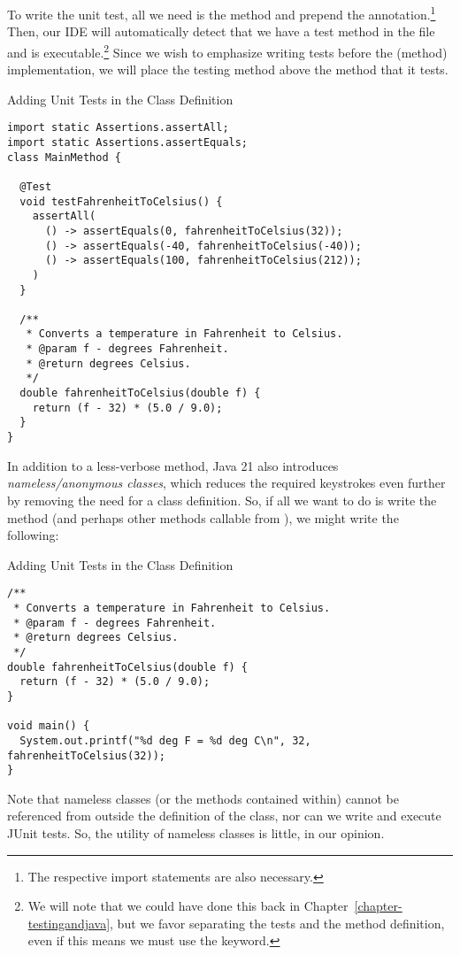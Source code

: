 To write the unit test, all we need is the  method and prepend the  annotation.\footnote{The respective import statements are also necessary.} Then, our IDE will automatically detect that we have a test method in the file and is executable.\footnote{We will note that we could have done this back in Chapter~\ref{chapter-testingandjava}, but we favor separating the tests and the method definition, even if this means we must use the  keyword.} Since we wish to emphasize writing tests before the (method) implementation, we will place the testing method above the method that it tests. 

\begin{cl}[]{Adding Unit Tests in the Class Definition}
\begin{lstlisting}[language=MyJava]
import static Assertions.assertAll;
import static Assertions.assertEquals;
class MainMethod {

  @Test
  void testFahrenheitToCelsius() {
    assertAll(
      () -> assertEquals(0, fahrenheitToCelsius(32));
      () -> assertEquals(-40, fahrenheitToCelsius(-40));
      () -> assertEquals(100, fahrenheitToCelsius(212));
    )
  }
  
  /**
   * Converts a temperature in Fahrenheit to Celsius.
   * @param f - degrees Fahrenheit.
   * @return degrees Celsius.
   */
  double fahrenheitToCelsius(double f) {
    return (f - 32) * (5.0 / 9.0); 
  }
}
\end{lstlisting}
\end{cl}

In addition to a less-verbose  method, Java 21 also introduces \textit{nameless/anonymous classes}, which reduces the required keystrokes even further by removing the need for a class definition. So, if all we want to do is write the  method (and perhaps other methods callable from ), we might write the following:

\begin{cl}[]{Adding Unit Tests in the Class Definition}
\begin{lstlisting}[language=MyJava]
/**
 * Converts a temperature in Fahrenheit to Celsius.
 * @param f - degrees Fahrenheit.
 * @return degrees Celsius.
 */
double fahrenheitToCelsius(double f) {
  return (f - 32) * (5.0 / 9.0); 
}

void main() {
  System.out.printf("%d deg F = %d deg C\n", 32, fahrenheitToCelsius(32));
}
\end{lstlisting}
\end{cl}

Note that nameless classes (or the methods contained within) cannot be referenced from outside the definition of the class, nor can we write and execute JUnit tests. So, the utility of nameless classes is little, in our opinion.